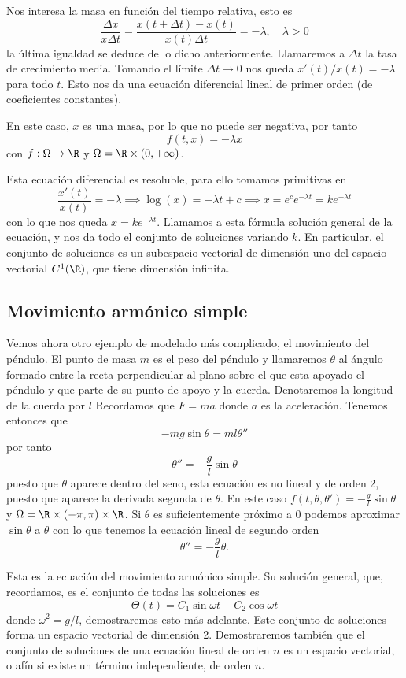 \documentclass[../main.tex]{subfiles}
\begin{document}
Nos interesa la masa en función del tiempo relativa, esto es
\[\frac{\Delta x}{x \Delta t} = \frac{x(t + \Delta t) - x(t)}{x(t) \Delta t}
	= -\lambda, \quad \lambda > 0\]
la última igualdad se deduce de lo dicho anteriormente. Llamaremos a
\(\Delta t\) la tasa de crecimiento media. Tomando el límite \(\Delta t \to 0\)
nos queda \(x'(t)/x(t) = -\lambda\) para todo \(t\). Esto nos da una ecuación
diferencial lineal de primer orden (de coeficientes constantes).

En este caso, \(x\) es una masa, por lo que no puede ser negativa, por tanto
\[f(t, x) = -\lambda x\]
con \(f : \Omega \to \R\) y \(\Omega = \R \times (0, +\infty)\).

Esta ecuación diferencial es resoluble, para ello tomamos primitivas en
\[\frac{x'(t)}{x(t)} = -\lambda \implies \log(x) = -\lambda t + c
	\implies x = e^c e^{-\lambda t} = k e^{-\lambda t}\]
con lo que nos queda \(x = k e^{-\lambda t}\). Llamamos a esta fórmula solución
general de la ecuación, y nos da todo el conjunto de soluciones variando
\(k\). En particular, el conjunto de soluciones es un subespacio vectorial de
dimensión uno del espacio vectorial \(C^1(\R)\), que tiene dimensión infinita.

\subsection{Movimiento armónico simple}

Vemos ahora otro ejemplo de modelado más complicado, el movimiento del péndulo.
El punto de masa \(m\) es el peso del péndulo y llamaremos \(\theta\) al ángulo
formado entre la recta perpendicular al plano sobre el que esta apoyado el
péndulo y que parte de su punto de apoyo y la cuerda. Denotaremos la longitud
de la cuerda por \(l\) Recordamos que \(F = ma\) donde \(a\) es la aceleración.
Tenemos entonces que
\[-m g \sin\theta = m l \theta''\]
por tanto
\[\theta'' = -\frac{g}{l} \sin\theta\]
puesto que \(\theta\) aparece dentro del seno, esta ecuación es no lineal y de
orden 2, puesto que aparece la derivada segunda de \(\theta\). En este caso
\(f(t, \theta, \theta') = -\frac{g}{l} \sin\theta\) y \(\Omega = \R \times
(-\pi, \pi) \times \R\). Si \(\theta\) es suficientemente próximo a \(0\)
podemos aproximar \(\sin\theta\) a \(\theta\) con lo que tenemos la ecuación
lineal de segundo orden
\[\theta'' = -\frac{g}{l}\theta.\]

Esta es la ecuación del movimiento armónico simple. Su solución general, que,
recordamos, es el conjunto de todas las soluciones es
\[\Theta(t) = C_1 \sin \omega t + C_2 \cos \omega t\]
donde \(\omega^2 = g/l\), demostraremos esto más adelante. Este conjunto de
soluciones forma un espacio vectorial de dimensión 2. Demostraremos también que
el conjunto de soluciones de una ecuación lineal de orden \(n\) es un espacio
vectorial, o afín si existe un término independiente, de orden \(n\).
\end{document}
